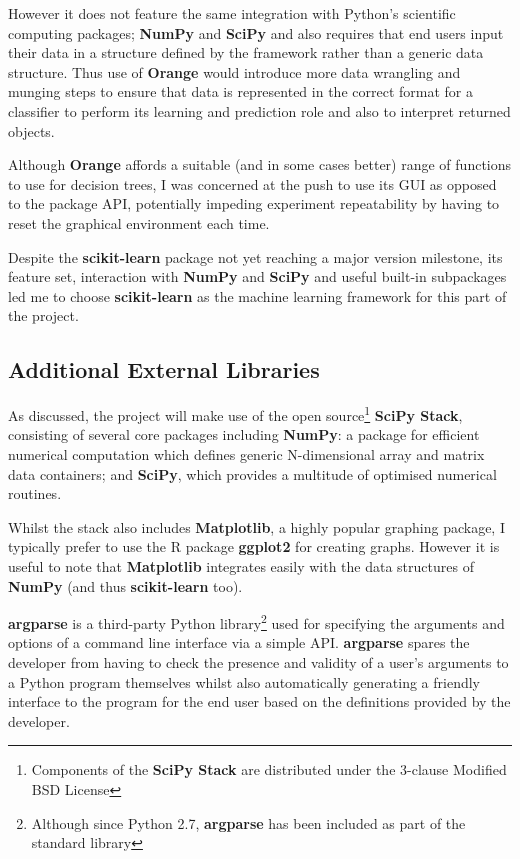 However it does not feature the same integration with
Python's scientific computing packages; \textbf{NumPy} and \textbf{SciPy} and
also requires that end users input their data in a structure defined by
the framework rather than a generic data structure.
Thus use of \textbf{Orange} would introduce more data wrangling and munging
steps to ensure that data is represented in the correct format for a classifier
to perform its learning and prediction role and also to interpret returned objects.

Although \textbf{Orange} affords a suitable (and in some cases better) range of
functions to use for decision trees, I was concerned at the push to use its GUI
as opposed to the package API, potentially impeding experiment repeatability by
having to reset the graphical environment each time.

Despite the \textbf{scikit-learn} package not yet reaching a major version
milestone, its feature set, interaction with \textbf{NumPy} and \textbf{SciPy}
and useful built-in subpackages led me to choose \textbf{scikit-learn} as the
machine learning framework for this part of the project.


\subsection{Additional External Libraries}
\label{sec:additional-libs}

As discussed, the project will make use of the open source\footnote{Components
of the \textbf{SciPy Stack} are distributed under the 3-clause Modified BSD
License\citep{scipy-lic}\citep{numpy-lic}} \textbf{SciPy Stack}, consisting of
several core packages including \textbf{NumPy}\citep{NumPySciPy}: a package for
efficient numerical computation which defines generic N-dimensional array and
matrix data containers; and \textbf{SciPy}\citep{SciPy}, which provides a
multitude of optimised numerical routines.

Whilst the stack also includes \textbf{Matplotlib}, a highly popular graphing
package, I typically prefer to use the R package \textbf{ggplot2}\citep{ggplot2}
for creating graphs. However it is useful to note that \textbf{Matplotlib}
integrates easily with the data structures of \textbf{NumPy} (and thus
\textbf{scikit-learn} too).

\textbf{argparse} is a third-party Python library\footnote{Although since Python
2.7, \textbf{argparse} has been included as part of the standard
library\citep{argparse-pypi}} used for specifying the arguments and options of a
command line interface via a simple API.  \textbf{argparse} spares the developer
from having to check the presence and validity of a user's arguments to a Python
program themselves whilst also automatically generating a friendly interface to
the program for the end user based on the definitions provided by the developer.


